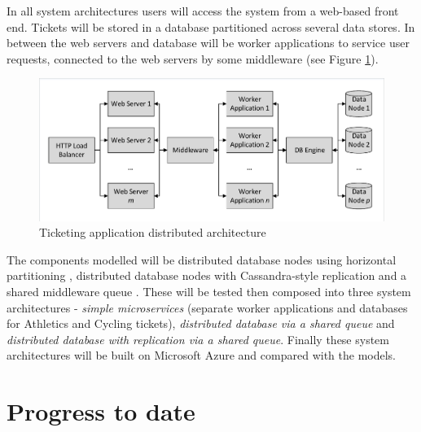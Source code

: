 \documentclass[runningheads]{llncs}
\begin{document}
In all system architectures users will access the system from a web-based front end.  Tickets will be stored in a database partitioned across several data stores.  In between the web servers and database will be worker applications to service user requests, connected to the web servers by some middleware (see Figure \ref{figure:architecture}).

\begin{figure}
	\caption{Ticketing application distributed architecture}
	\label{figure:architecture}
	\centering
	\includegraphics[trim = 5 5 5 5, clip, width=\textwidth]{img/application}
\end{figure}

The components modelled will be distributed database nodes using horizontal partitioning \cite{RN68}, distributed database nodes with Cassandra-style replication \cite{RN1050} and a shared middleware queue \cite{RN65}.  These will be tested then composed into three system architectures - \textit{simple microservices} (separate worker applications and databases for Athletics and Cycling tickets), \textit{distributed database via a shared queue}  and \textit{distributed database with replication via a shared queue}.  Finally these system architectures will be built on Microsoft Azure and compared with the models.

%
%

\section{Progress to date}
\end{document}
